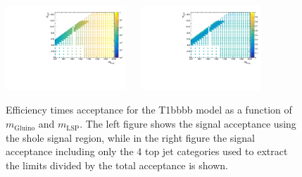 \begin{figure}[h!]
  \begin{center}
    \includegraphics[width=0.4\textwidth]{figures/jetRanking/T1bbbb/eff/T1bbbb_merging_9_cats.pdf} ~~
    \includegraphics[width=0.4\textwidth]{figures/susyResults/T1bbbb_doubleRatioAcceptance.pdf} \\
    \caption{
      Efficiency times acceptance for the T1bbbb model as a function of $m_{\mathrm{Gluino}}$ and $m_{\mathrm{LSP}}$. 
      The left figure shows the signal acceptance using the shole signal region, 
      while in the right figure the signal acceptance including only the 4 top jet categories used to extract the limits divided by the total acceptance is shown.
    }
    \label{fig:sig-eff-T1bbbb}
  \end{center}
\end{figure}

